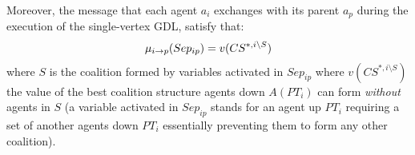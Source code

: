 \documentclass{aamas2012}
\begin{document}
Moreover, the message that each agent $a_i$ exchanges with its parent $a_p$ during the execution of the single-vertex GDL, satisfy that:
\begin{equation}
\mu_{i\rightarrow
p}(Sep_{ip}) = v(CS^{*,i\setminus S})
\label{eq:message_2_optimal_coalition_structure}
\vspace{-0.05in}
\end{equation}
where $S$ is the coalition formed by
variables activated in $Sep_{ip}$ where $v(CS^{*,i\setminus S})$ the value of the best coalition structure agents down
$A(PT_i)$ can form \emph{without} agents in $S$ (a variable activated
in $Sep_{ip}$ stands for an agent up $PT_i$ requiring a set of another
agents down $PT_i$ essentially preventing them to form any other coalition).
 
\end{document}
